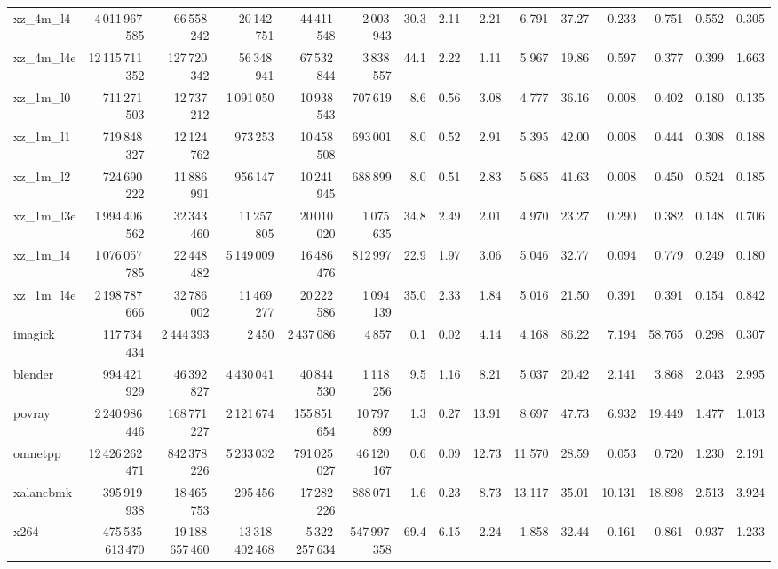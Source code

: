 \documentclass[9pt,landscape,a4paper]{article}
\begin{document}
\begin{adjustbox}{max width=\textwidth, max totalheight=0.50\textheight}
\begin{tabular}{lrrrrrrrrrrrrrr}
xz\_4m\_l4 & 4\,011\,967\,585 & 66\,558\,242 & 20\,142\,751 & 44\,411\,548 & 2\,003\,943 & 30.3 & 2.11 & 2.21 & 6.791 & 37.27 & 0.233 & 0.751 & 0.552 & 0.305 \\
xz\_4m\_l4e & 12\,115\,711\,352 & 127\,720\,342 & 56\,348\,941 & 67\,532\,844 & 3\,838\,557 & 44.1 & 2.22 & 1.11 & 5.967 & 19.86 & 0.597 & 0.377 & 0.399 & 1.663 \\
xz\_1m\_l0 & 711\,271\,503 & 12\,737\,212 & 1\,091\,050 & 10\,938\,543 & 707\,619 & 8.6 & 0.56 & 3.08 & 4.777 & 36.16 & 0.008 & 0.402 & 0.180 & 0.135 \\
xz\_1m\_l1 & 719\,848\,327 & 12\,124\,762 & 973\,253 & 10\,458\,508 & 693\,001 & 8.0 & 0.52 & 2.91 & 5.395 & 42.00 & 0.008 & 0.444 & 0.308 & 0.188 \\
xz\_1m\_l2 & 724\,690\,222 & 11\,886\,991 & 956\,147 & 10\,241\,945 & 688\,899 & 8.0 & 0.51 & 2.83 & 5.685 & 41.63 & 0.008 & 0.450 & 0.524 & 0.185 \\
xz\_1m\_l3e & 1\,994\,406\,562 & 32\,343\,460 & 11\,257\,805 & 20\,010\,020 & 1\,075\,635 & 34.8 & 2.49 & 2.01 & 4.970 & 23.27 & 0.290 & 0.382 & 0.148 & 0.706 \\
xz\_1m\_l4 & 1\,076\,057\,785 & 22\,448\,482 & 5\,149\,009 & 16\,486\,476 & 812\,997 & 22.9 & 1.97 & 3.06 & 5.046 & 32.77 & 0.094 & 0.779 & 0.249 & 0.180 \\
xz\_1m\_l4e & 2\,198\,787\,666 & 32\,786\,002 & 11\,469\,277 & 20\,222\,586 & 1\,094\,139 & 35.0 & 2.33 & 1.84 & 5.016 & 21.50 & 0.391 & 0.391 & 0.154 & 0.842 \\
imagick & 117\,734\,434 & 2\,444\,393 & 2\,450 & 2\,437\,086 & 4\,857 & 0.1 & 0.02 & 4.14 & 4.168 & 86.22 & 7.194 & 58.765 & 0.298 & 0.307 \\
blender & 994\,421\,929 & 46\,392\,827 & 4\,430\,041 & 40\,844\,530 & 1\,118\,256 & 9.5 & 1.16 & 8.21 & 5.037 & 20.42 & 2.141 & 3.868 & 2.043 & 2.995 \\
povray & 2\,240\,986\,446 & 168\,771\,227 & 2\,121\,674 & 155\,851\,654 & 10\,797\,899 & 1.3 & 0.27 & 13.91 & 8.697 & 47.73 & 6.932 & 19.449 & 1.477 & 1.013 \\
omnetpp & 12\,426\,262\,471 & 842\,378\,226 & 5\,233\,032 & 791\,025\,027 & 46\,120\,167 & 0.6 & 0.09 & 12.73 & 11.570 & 28.59 & 0.053 & 0.720 & 1.230 & 2.191 \\
xalancbmk & 395\,919\,938 & 18\,465\,753 & 295\,456 & 17\,282\,226 & 888\,071 & 1.6 & 0.23 & 8.73 & 13.117 & 35.01 & 10.131 & 18.898 & 2.513 & 3.924 \\
x264 & 475\,535\,613\,470 & 19\,188\,657\,460 & 13\,318\,402\,468 & 5\,322\,257\,634 & 547\,997\,358 & 69.4 & 6.15 & 2.24 & 1.858 & 32.44 & 0.161 & 0.861 & 0.937 & 1.233 \\

\end{tabular}
\end{adjustbox}
\end{document}
